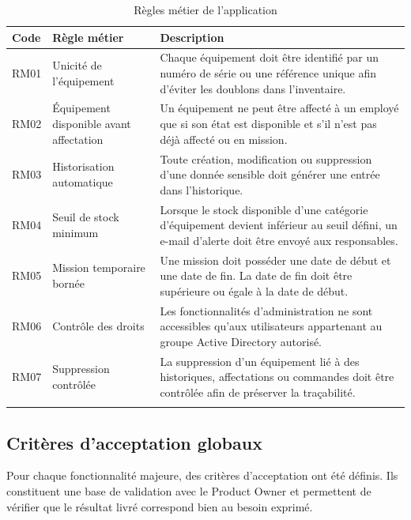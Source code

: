\begin{longtable}{|m{1.5cm}|m{5cm}|m{7.5cm}|}
\hline
\textbf{Code} & \textbf{Règle métier} & \textbf{Description} \\
\hline
\endhead
\endfoot
\endlastfoot
\hline
RM01 & Unicité de l'équipement & Chaque équipement doit être identifié par un numéro de série ou une référence unique afin d'éviter les doublons dans l'inventaire. \\
\hline
RM02 & Équipement disponible avant affectation & Un équipement ne peut être affecté à un employé que si son état est disponible et s'il n'est pas déjà affecté ou en mission. \\
\hline
RM03 & Historisation automatique & Toute création, modification ou suppression d'une donnée sensible doit générer une entrée dans l'historique. \\
\hline
RM04 & Seuil de stock minimum & Lorsque le stock disponible d'une catégorie d'équipement devient inférieur au seuil défini, un e-mail d'alerte doit être envoyé aux responsables. \\
\hline
RM05 & Mission temporaire bornée & Une mission doit posséder une date de début et une date de fin. La date de fin doit être supérieure ou égale à la date de début. \\
\hline
RM06 & Contrôle des droits & Les fonctionnalités d'administration ne sont accessibles qu'aux utilisateurs appartenant au groupe Active Directory autorisé. \\
\hline
RM07 & Suppression contrôlée & La suppression d'un équipement lié à des historiques, affectations ou commandes doit être contrôlée afin de préserver la traçabilité. \\
\hline
\captionsetup{justification=centering,margin=1cm}
\caption{Règles métier de l'application}
\end{longtable}

\subsection{Critères d'acceptation globaux}

Pour chaque fonctionnalité majeure, des critères d'acceptation ont été définis. Ils constituent une base de validation avec le Product Owner et permettent de vérifier que le résultat livré correspond bien au besoin exprimé.

